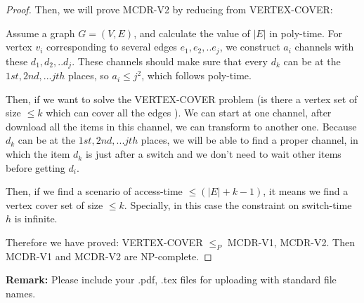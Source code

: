 \documentclass[12pt,a4paper]{article}
\theoremstyle{definition}
\begin{document}
\begin{enumerate}
\begin{proof}
 		Then, we will prove MCDR-V2 by reducing from VERTEX-COVER:
 		
 			Assume a graph $G=(V,E)$, and calculate the value of $|E|$ in poly-time. For vertex $v_i$ corresponding to several edges $e_1,e_2,..e_j$, we construct $a_i$ channels with these $d_1,d_2,..d_j$. These channels should make sure that every $d_k$ can be at the $1st,2nd,...jth$ places,
 			so $a_i\leq j^2$, which follows poly-time.
 			
 			Then, if we want to solve the VERTEX-COVER problem (is there a vertex set of size $\leq k$ which can cover all the edges ). We can start at one channel, after download all the items in this channel, we can transform to another one. Because $d_k$ can be at the $1st,2nd,...jth$ places, we will be able to find a proper channel, in which the item $d_k$ is just after a switch and we don't need to wait other items before getting $d_i$. 
 			
 			 Then, if we find a scenario of access-time $\leq (|E|+k-1)$, it means we find a vertex cover set of size $\leq k$. Specially, in this case  the constraint on switch-time $h$ is infinite.
 			 
 			 Therefore we have proved: VERTEX-COVER $\leq_P$ MCDR-V1, MCDR-V2. Then MCDR-V1 and MCDR-V2 are NP-complete. 
 		
 		
         \end{proof}
\end{enumerate}

\textbf{Remark:} Please include your .pdf, .tex files for uploading with standard file names.




\end{document}
